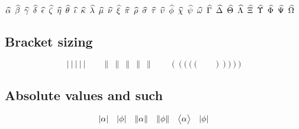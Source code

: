 \documentclass[noaddress, tikz]{nmd/article}
\newcommand{\sizetest}[1]{%
  #1 \ \big#1 \ \Big#1 \ \bigg#1 \ \Bigg#1 %
}
\begin{document}
$\alphahat \enskip \betahat \enskip \gammahat \enskip \deltahat \enskip \epsilonhat \enskip \zetahat \enskip \etahat \enskip \thetahat \enskip \iotahat \enskip \kappahat \enskip \lambdahat \enskip \muhat \enskip \nuhat \enskip \xihat \enskip \pihat \enskip \rhohat \enskip \sigmahat \enskip \tauhat \enskip \upsilonhat \enskip \phihat \enskip \chihat \enskip \psihat \enskip \omegahat \enskip \Gammahat \enskip \Deltahat \enskip \Thetahat \enskip \Lambdahat \enskip \Xihat \enskip \Upsilonhat \enskip \Phihat \enskip \Psihat \enskip \Omegahat$

\subsection*{Bracket sizing}

\[
\sizetest{|} \qquad \sizetest{\|}  \qquad \sizetest{(} \qquad \sizetest{)}
\]

\subsection*{Absolute values and such}

\[
{\left| \alpha \right|} \quad {\left| \phi \right|} \quad {\left\| \alpha \right\|} \quad {\| \phi \|}
\quad {\big\langle \alpha \big\rangle} \quad {| \phi |}
\]


{\RaggedRight 
 

}
\end{document}
